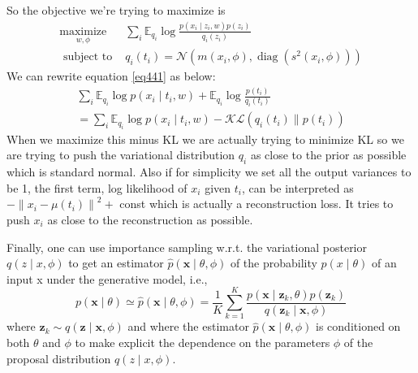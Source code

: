 \documentclass[12pt]{article}
\begin{document}
So the objective we're trying to maximize is
\begin{equation}\begin{array}{ll}
\underset{w, \phi}{\operatorname{maximize}} & \sum_{i} \mathbb{E}_{q_{i}} \log \frac{p\left(x_{i} \mid z_{i}, w\right) p\left(z_{i}\right)}{q_{i}\left(z_{i}\right)} \\
\text { subject to } & q_{i}\left(t_{i}\right)=\mathcal{N}\left(m\left(x_{i}, \phi\right), \operatorname{diag}\left(s^{2}\left(x_{i}, \phi\right)\right)\right)
\end{array}\label{eq441}\end{equation}
We can rewrite equation \ref{eq441} as below:
\begin{equation}
\begin{array}{l}
\sum_{i} \mathbb{E}_{q_{i}} \log p\left(x_{i} \mid t_{i}, w\right)+\mathbb{E}_{q_{i}} \log \frac{p\left(t_{i}\right)}{q_{i}\left(t_{i}\right)} \\
=\sum_{i} \mathbb{E}_{q_{i}} \log p\left(x_{i} \mid t_{i}, w\right)-\mathcal{K} \mathcal{L}\left(q_{i}\left(t_{i}\right) \| p\left(t_{i}\right)\right)
\end{array}
\end{equation}
When we maximize this minus KL we are actually trying to minimize KL so we are trying to push the variational distribution $q_i$ as close to the prior as possible which is standard normal. Also if for simplicity we set all the output variances to be 1, the first term, log likelihood of $x_i$ given $t_i$, can be interpreted as $-\left\|x_{i}-\mu\left(t_{i}\right)\right\|^{2}+$ const which is actually a reconstruction loss.  It tries to push $x_i$ as close to the reconstruction as possible.


Finally, one can use importance sampling w.r.t. the variational posterior $q(z \mid x, \phi)$ to get an estimator $\hat{p}(\mathbf{x} \mid \theta, \phi)$ of the probability $p(x \mid \theta)$ of an input x under the generative model, i.e., 
$$
p(\mathbf{x} \mid \theta) \simeq \hat{p}(\mathbf{x} \mid \theta, \phi)=\frac{1}{K} \sum_{k=1}^{K} \frac{p\left(\mathbf{x} \mid \mathbf{z}_{k}, \theta\right) p\left(\mathbf{z}_{k}\right)}{q\left(\mathbf{z}_{k} \mid \mathbf{x}, \phi\right)}
$$
where $\mathbf{z}_{k} \sim q(\mathbf{z} \mid \mathbf{x}, \phi)$ and where the estimator $\hat{p}(\mathbf{x} \mid \theta, \phi)$ is conditioned on both $\theta$ and $\phi$ to make explicit the dependence on the parameters $\phi$ of the proposal distribution $q(z \mid x, \phi)$.
\end{document}

